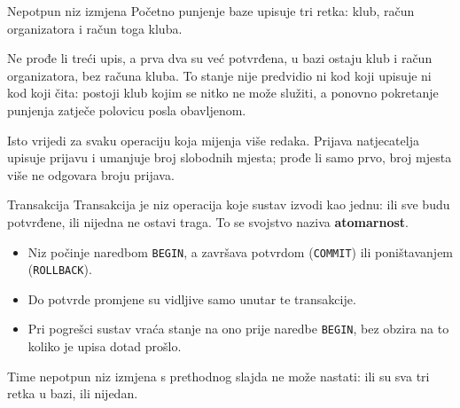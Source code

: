 \begin{frame}{Nepotpun niz izmjena}
Početno punjenje baze upisuje tri retka: klub, račun organizatora i račun toga kluba.

\vspace{0.5em}
Ne prođe li treći upis, a prva dva su već potvrđena, u bazi ostaju klub i račun organizatora, bez računa kluba. To stanje nije predvidio ni kod koji upisuje ni kod koji čita: postoji klub kojim se nitko ne može služiti, a ponovno pokretanje punjenja zatječe polovicu posla obavljenom.

\vspace{0.5em}
Isto vrijedi za svaku operaciju koja mijenja više redaka. Prijava natjecatelja upisuje prijavu i umanjuje broj slobodnih mjesta; prođe li samo prvo, broj mjesta više ne odgovara broju prijava.
\end{frame}

\begin{frame}{Transakcija}
Transakcija je niz operacija koje sustav izvodi kao jednu: ili sve budu potvrđene, ili nijedna ne ostavi traga. To se svojstvo naziva \textbf{atomarnost}.

\begin{itemize}
  \item Niz počinje naredbom \texttt{BEGIN}, a završava potvrdom (\texttt{COMMIT}) ili poništavanjem (\texttt{ROLLBACK}).
  \item Do potvrde promjene su vidljive samo unutar te transakcije.
  \item Pri pogrešci sustav vraća stanje na ono prije naredbe \texttt{BEGIN}, bez obzira na to koliko je upisa dotad prošlo.
\end{itemize}

\vspace{0.5em}
Time nepotpun niz izmjena s prethodnog slajda ne može nastati: ili su sva tri retka u bazi, ili nijedan.
\end{frame}


